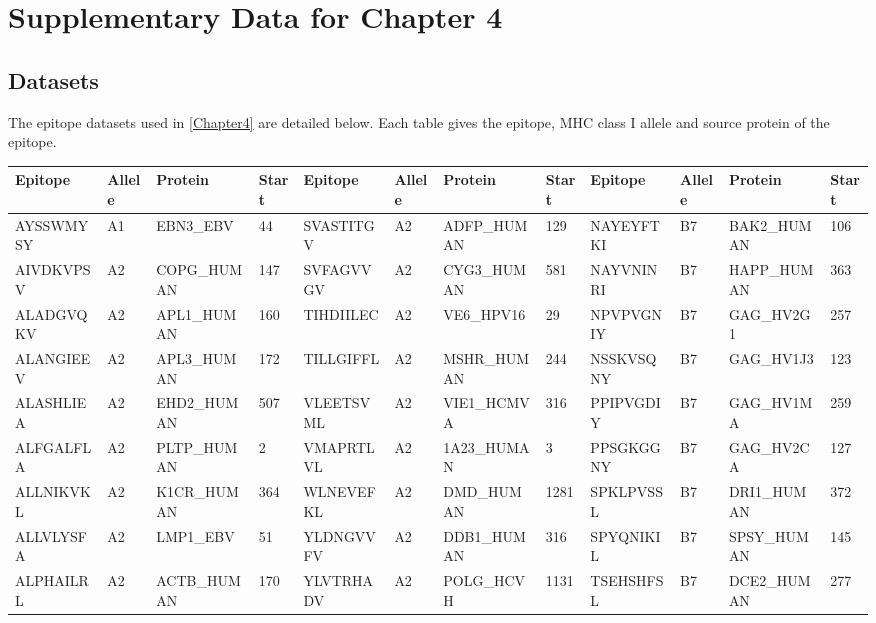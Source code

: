 
\chapter{Supplementary Data for Chapter 4}\label{AppendixA}

\section{Datasets}

The epitope datasets used in \cref{Chapter4} are detailed below. Each table gives the epitope, MHC class I allele and source protein of the epitope.

\clearpage

\begin{table}[htp]
\begin{center}
\begin{sideways}
{
\scriptsize
\begin{tabulary}{1.5\textwidth}{|l|l|l|l|l|l|l|l|l|l|l|l|}
\hline
Epitope & Allele & Protein & Start & Epitope & Allele & Protein & Start & Epitope & Allele & Protein & Start\bigstrut \\
\hline
AYSSWMYSY & A1 & EBN3\_EBV & 44 & SVASTITGV & A2 & ADFP\_HUMAN & 129 & NAYEYFTKI & B7 & BAK2\_HUMAN & 106 \bigstrut[t] \\
AIVDKVPSV & A2 & COPG\_HUMAN & 147 & SVFAGVVGV & A2 & CYG3\_HUMAN & 581 & NAYVNINRI & B7 & HAPP\_HUMAN & 363 \\
ALADGVQKV & A2 & APL1\_HUMAN & 160 & TIHDIILEC & A2 & VE6\_HPV16 & 29 & NPVPVGNIY & B7 & GAG\_HV2G1 & 257 \\
ALANGIEEV & A2 & APL3\_HUMAN & 172 & TILLGIFFL & A2 & MSHR\_HUMAN & 244 & NSSKVSQNY & B7 & GAG\_HV1J3 & 123 \\
ALASHLIEA & A2 & EHD2\_HUMAN & 507 & VLEETSVML & A2 & VIE1\_HCMVA & 316 & PPIPVGDIY & B7 & GAG\_HV1MA & 259 \\
ALFGALFLA & A2 & PLTP\_HUMAN & 2 & VMAPRTLVL & A2 & 1A23\_HUMAN & 3 & PPSGKGGNY & B7 & GAG\_HV2CA & 127 \\
ALLNIKVKL & A2 & K1CR\_HUMAN & 364 & WLNEVEFKL & A2 & DMD\_HUMAN & 1281 & SPKLPVSSL & B7 & DRI1\_HUMAN & 372 \\
ALLVLYSFA & A2 & LMP1\_EBV & 51 & YLDNGVVFV & A2 & DDB1\_HUMAN & 316 & SPYQNIKIL & B7 & SPSY\_HUMAN & 145 \\
ALPHAILRL & A2 & ACTB\_HUMAN & 170 & YLVTRHADV & A2 & POLG\_HCVH & 1131 & TSEHSHFSL & B7 & DCE2\_HUMAN & 277 \\

\end{tabulary}}
\end{sideways}
\end{center}
\end{table}
